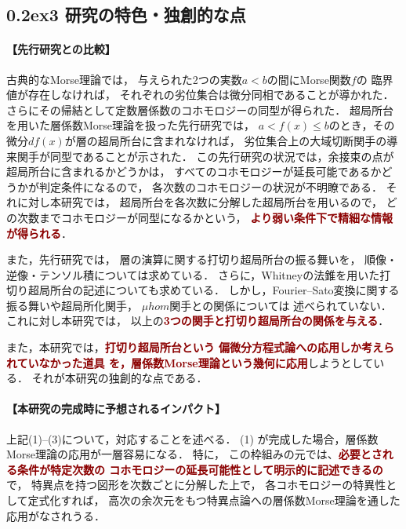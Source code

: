 \documentclass[11pt,a4paper,uplatex,dvipdfmx]{ujarticle} 		%
\newcommand{\研究課題名}{打切り超局所台の関手的性質の研究とMorse理論への応用}
\newcommand{\研究機関名}{北海道大学}
\newcommand{\研究代表者氏名}{大柴寿浩}
\newcommand{\ctext}[1]{\raise0.2ex\hbox{\textcircled{\scriptsize{#1}}}}
\begin{document}
\vspace{-22pt}
\subsection*{\ctext{3} 研究の特色・独創的な点}


\paragraph{【先行研究との比較】}
古典的なMorse理論では，
与えられた2つの実数\(a<b\)の間にMorse関数\(f\)の
臨界値が存在しなければ，
それぞれの劣位集合は微分同相であることが導かれた．
さらにその帰結として定数層係数のコホモロジーの同型が得られた．
超局所台を用いた層係数Morse理論を扱った先行研究\cite{ST92}では，
\(a<f(x)\leq b\)のとき，その微分\(df(x)\)が層の超局所台に含まれなければ，
劣位集合上の大域切断関手の導来関手が同型であることが示された．
この先行研究の状況では，余接束の点が超局所台に含まれるかどうかは，
すべてのコホモロジーが延長可能であるかどうかが判定条件になるので，
各次数のコホモロジーの状況が不明瞭である．
それに対し本研究では，
超局所台を各次数に分解した超局所台を用いるので，
どの次数までコホモロジーが同型になるかという，
\textcolor{darkred}{\textbf{より弱い条件下で精細な情報が得られる}}．

また，先行研究\cite{KMS03a,KMS03b}では，
層の演算に関する打切り超局所台の振る舞いを，
順像・逆像・テンソル積については求めている．
さらに，Whitneyの法錐を用いた打切り超局所台の記述についても求めている．
しかし，Fourier--Sato変換に関する振る舞いや超局所化関手，
\(\mu hom\)関手との関係については
述べられていない．
これに対し本研究では，
以上の\textcolor{darkred}{\textbf{3つの関手と打切り超局所台の関係を与える}}．

また，本研究では，\textcolor{darkred}{\textbf{打切り超局所台という
偏微分方程式論への応用しか考えられていなかった道具
を，層係数Morse理論という幾何に応用}}しようとしている．
それが本研究の独創的な点である．

\vspace{-10pt}
\paragraph{【本研究の完成時に予想されるインパクト】}
上記(1)--(3)について，対応することを述べる．
(1) が完成した場合，層係数Morse理論の応用が一層容易になる．
特に，
この枠組みの元では、\textcolor{darkred}{\textbf{必要とされる条件が特定次数の
コホモロジーの延長可能性として明示的に記述できるの}}で，
特異点を持つ図形を次数ごとに分解した上で，
各コホモロジーの特異性として定式化すれば，
高次の余次元をもつ特異点論への層係数Morse理論を通した応用がなされうる．
\end{document}
